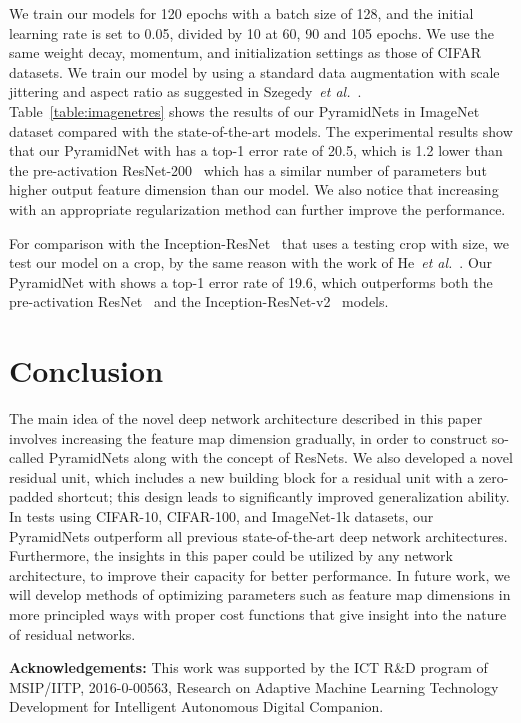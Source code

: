 \documentclass[10pt,twocolumn,letterpaper]{article}
\begin{document}
We train our models for 120 epochs with a batch size of 128, and the initial learning rate is set to 0.05, divided by 10 at 60, 90 and 105 epochs. We use the same weight decay, momentum, and initialization settings as those of CIFAR datasets. We train our model by using a standard data augmentation with scale jittering and aspect ratio as suggested in Szegedy~{\it et al.}~\cite{GoogleNet}. Table~\ref{table:imagenetres} shows the results of our PyramidNets in ImageNet dataset compared with the state-of-the-art models. The experimental results show that our PyramidNet with  has a top-1 error rate of 20.5, which is 1.2 lower than the pre-activation ResNet-200~\cite{preresnet} which has a similar number of parameters but higher output feature dimension than our model. We also notice that increasing  with an appropriate regularization method can further improve the performance.

For comparison with the Inception-ResNet~\cite{InceptionResnet} that uses a testing crop with  size, we test our model on a  crop, by the same reason with the work of He~{\it et al.}~\cite{preresnet}. Our PyramidNet with  shows a top-1 error rate of 19.6, which outperforms both the pre-activation ResNet~\cite{preresnet} and the Inception-ResNet-v2~\cite{InceptionResnet} models.
\section{Conclusion}
The main idea of the novel deep network architecture described in this paper involves increasing the feature map dimension gradually, in order to construct so-called PyramidNets along with the concept of ResNets. We also developed a novel residual unit, which includes a new building block for a residual unit with a zero-padded shortcut; this design leads to significantly improved generalization ability. In tests using CIFAR-10, CIFAR-100, and ImageNet-1k datasets, our PyramidNets outperform all previous state-of-the-art deep network architectures. Furthermore, the insights in this paper could be utilized by any network architecture, to improve their capacity for better performance. In future work, we will develop methods of optimizing parameters such as feature map dimensions in more principled ways with proper cost functions that give insight into the nature of residual networks.
\label{sec:conclusion}


{\noindent  \bf Acknowledgements:}
{
This work was supported by the ICT R\&D program of MSIP/IITP, 2016-0-00563, Research on Adaptive Machine Learning Technology Development for Intelligent Autonomous Digital Companion.
}

{\small


}
\end{document}
